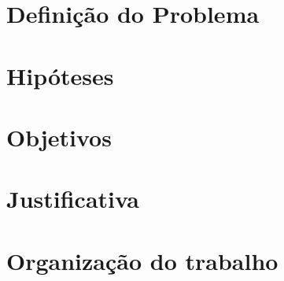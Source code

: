 \section{Definição do Problema}

\section{Hipóteses}

\section{Objetivos}

\section{Justificativa}

\section{Organização do trabalho}